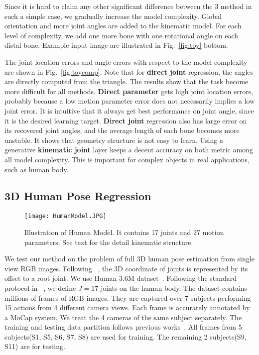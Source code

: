 \documentclass[runningheads]{llncs}
\begin{document}
Since it is hard to claim any other significant difference between the 3 method in such a simple case, we gradually increase the model complexity. Global orientation and more joint angles are added to the kinematic model. For each level of complexity, we add one more bone with one rotational angle on each distal bone. Example input image are illustrated in Fig.~\ref{fig:toy} bottom.

The joint location errors and angle errors with respect to the model complexity are shown in Fig.~\ref{fig:toycomp}. Note that for \textbf{direct joint} regression, the angles are directly computed from the triangle. The results show that the task become more difficult for all methods.
\textbf{Direct parameter} gets high joint location errors, probably because a low motion parameter error does not necessarily implies a low joint error. It is intuitive that it always get best performance on joint angle, since it is the desired learning target.
\textbf{Direct joint} regression also has large error on its recovered joint angles, and the average length of each bone becomes more unstable. It shows that geometry structure is not easy to learn. Using a generative \textbf{kinematic joint} layer keeps a decent accuracy on both metric among all model complexity. This is important for complex objects in real applications, such as human body.

\subsection{3D Human Pose Regression}

\begin{figure}
\begin{center}
\texttt{[image: HumanModel.JPG]}
\end{center}
   \caption{Illustration of Human Model. It contains 17 joints and 27 motion parameters. See text for the detail kinematic structure.}
\label{fig:humanmodel}
\end{figure}

We test our method on the problem of full 3D human pose estimation from single view RGB images. Following ~\cite{li20143d}, the 3D coordinate of joints is represented by its offset to a root joint. We use Human 3.6M dataset~\cite{h36m_pami}. Following the standard protocol in ~\cite{h36m_pami,li20143d,Zhou_2015_CVPR}, we define $J = 17$ joints on the human body. The dataset contains millions of frames of RGB images. They are captured over 7 subjects performing 15 actions from 4 different camera views. Each frame is accurately annotated by a MoCap system. We treat the 4 cameras of the same subject separately. The training and testing data partition follows previous works~\cite{h36m_pami,li20143d,Zhou_2016_CVPR}. All frames from 5 subjects(S1, S5, S6, S7, S8) are used for training. The remaining 2 subjects(S9, S11) are for testing.
\end{document}
